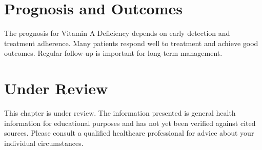 \section*{Prognosis and Outcomes}
The prognosis for Vitamin A Deficiency depends on early detection and treatment adherence. Many patients respond well to treatment and achieve good outcomes. Regular follow-up is important for long-term management.
\section*{Under Review}
This chapter is under review. The information presented is general health information for educational purposes and has not yet been verified against cited sources. Please consult a qualified healthcare professional for advice about your individual circumstances.


\clearpage
